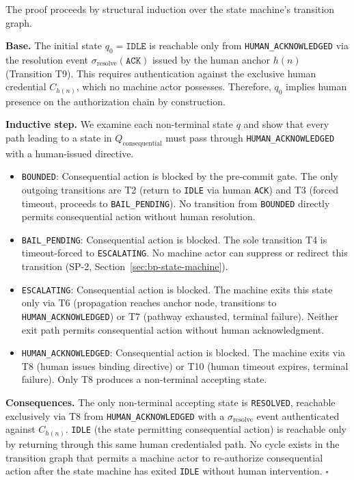 \begin{Proof}
The proof proceeds by structural induction over the state machine's
transition graph.

\textbf{Base.}  The initial state $q_0 = \texttt{IDLE}$ is reachable only
from \texttt{HUMAN\_ACKNOWLEDGED} via the resolution event
$\sigma_{\text{resolve}}(\texttt{ACK})$ issued by the human anchor $h(n)$
(Transition T9).  This requires authentication against the exclusive human
credential $C_{h(n)}$, which no machine actor possesses.  Therefore,
$q_0$ implies human presence on the authorization chain by construction.

\textbf{Inductive step.}  We examine each non-terminal state $q$ and show
that every path leading to a state in $Q_{\text{consequential}}$ must pass
through \texttt{HUMAN\_ACKNOWLEDGED} with a human-issued directive.

\begin{itemize}
\item \texttt{BOUNDED}: Consequential action is blocked by the pre-commit
gate.  The only outgoing transitions are T2 (return to \texttt{IDLE} via
human \texttt{ACK}) and T3 (forced timeout, proceeds to
\texttt{BAIL\_PENDING}).  No transition from \texttt{BOUNDED} directly permits
consequential action without human resolution.

\item \texttt{BAIL\_PENDING}: Consequential action is blocked.  The sole
transition T4 is timeout-forced to \texttt{ESCALATING}.  No machine actor can
suppress or redirect this transition (SP-2, Section~\ref{sec:bp-state-machine}).

\item \texttt{ESCALATING}: Consequential action is blocked.  The machine
exits this state only via T6 (propagation reaches anchor node, transitions
to \texttt{HUMAN\_ACKNOWLEDGED}) or T7 (pathway exhausted, terminal failure).
Neither exit path permits consequential action without human acknowledgment.

\item \texttt{HUMAN\_ACKNOWLEDGED}: Consequential action is blocked.  The
machine exits via T8 (human issues binding directive) or T10 (human timeout
expires, terminal failure).  Only T8 produces a non-terminal accepting state.
\end{itemize}

\textbf{Consequences.}  The only non-terminal accepting state is
\texttt{RESOLVED}, reachable exclusively via T8 from
\texttt{HUMAN\_ACKNOWLEDGED} with a $\sigma_{\text{resolve}}$ event
authenticated against $C_{h(n)}$.  \texttt{IDLE} (the state permitting
consequential action) is reachable only by returning through this same human
credentialed path.  No cycle exists in the transition graph that permits a
machine actor to re-authorize consequential action after the state machine
has exited \texttt{IDLE} without human intervention.  $\square$
\end{Proof}

